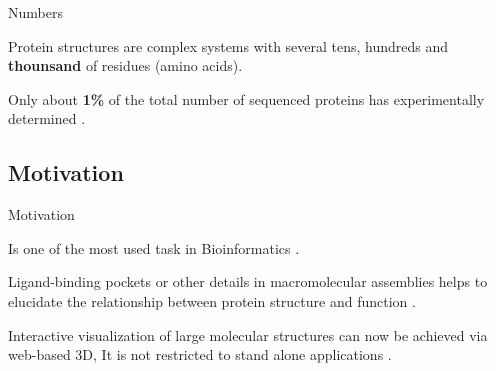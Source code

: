 \documentclass[10pt]{beamer}
\newcommand{\1}{
        	\setbeamertemplate{background}{
        		\texttt{[image: img/1]}
        		\tikz[overlay] \fill[fill opacity=0.75,fill=white] (0,0) rectangle (-\paperwidth,\paperheight);
        	}
}
\begin{document}
\begin{frame}{Numbers}{}

	\begin{block}{}
		Protein structures are complex systems with several tens, hundreds and \textbf{thounsand} of residues (amino acids).	
	\end{block}	

	\begin{block}{}
		Only about \textbf{1\%} of the total number of sequenced proteins has experimentally determined \cite{rangwala2011introduction}.
	\end{block}	

\end{frame}

\subsection{Motivation}

\begin{frame}{Motivation}{}	

\begin{block}{}
	Is one of the most used task in Bioinformatics \cite{o2010visualization, mura2010introduction}.
\end{block}	
\pause
\begin{block}{}
	Ligand-binding pockets or other details in macromolecular assemblies helps to elucidate the	relationship between protein structure and function \cite{reynolds2018ezmol}.
\end{block}
\pause
\begin{block}{}
	Interactive visualization of large molecular structures can now be achieved via web-based 3D, It is not restricted to stand alone applications \cite{wang2020icn3d}.
\end{block}

\end{frame}
\end{document}
